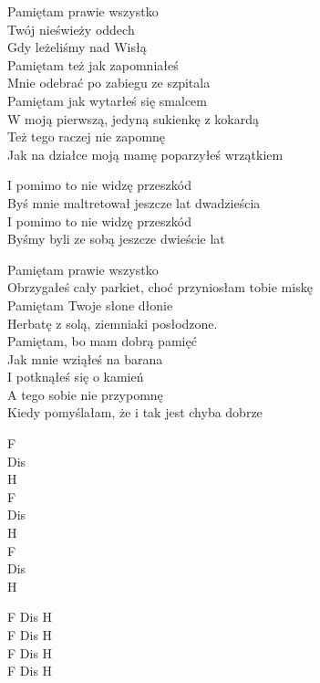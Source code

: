 \begin{text}
    Pamiętam prawie wszystko\\
    Twój nieświeży oddech\\
    Gdy leżeliśmy nad Wisłą\\
    Pamiętam też jak zapomniałeś\\
    Mnie odebrać po zabiegu ze szpitala\\
    Pamiętam jak wytarłeś się smalcem\\
    W moją pierwszą, jedyną sukienkę z kokardą\\
    Też tego raczej nie zapomnę\\
    Jak na działce moją mamę poparzyłeś wrzątkiem

    \vin I pomimo to nie widzę przeszkód\\
    \vin Byś mnie maltretował jeszcze lat dwadzieścia\\
    \vin I pomimo to nie widzę przeszkód\\
    \vin Byśmy byli ze sobą jeszcze dwieście lat

    Pamiętam prawie wszystko\\
    Obrzygałeś cały parkiet, choć przyniosłam tobie miskę\\
    Pamiętam Twoje słone dłonie\\
    Herbatę z solą, ziemniaki posłodzone.\\
    Pamiętam, bo mam dobrą pamięć\\
    Jak mnie wziąłeś na barana\\
    I potknąłeś się o kamień\\
    A tego sobie nie przypomnę\\
    Kiedy pomyślałam, że i tak jest chyba dobrze
\end{text}
\begin{chord}
    F\\
    Dis\\
    H\\
    F\\
    Dis\\
    H\\
    F\\
    Dis\\
    H

    F Dis H\\
    F Dis H\\
    F Dis H\\
    F Dis H
\end{chord}